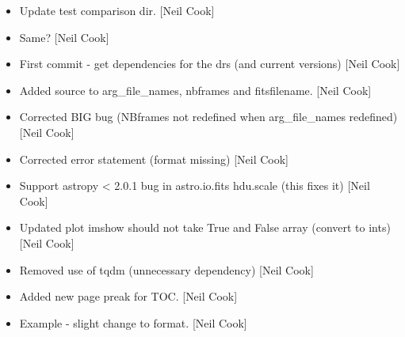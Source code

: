 \documentclass[a4paper,10pt,english]{report}
\begin{document}
\begin{itemize}
\item {} 
Update test comparison dir. {[}Neil Cook{]}

\item {} 
Same? {[}Neil Cook{]}

\item {} 
First commit - get dependencies for the drs (and current versions)
{[}Neil Cook{]}

\item {} 
Added source to arg\_file\_names, nbframes and fitsfilename. {[}Neil Cook{]}

\item {} 
Corrected BIG bug (NBframes not redefined when arg\_file\_names
redefined) {[}Neil Cook{]}

\item {} 
Corrected error statement (format missing) {[}Neil Cook{]}

\item {} 
Support astropy \textless{} 2.0.1 bug in astro.io.fits hdu.scale (this fixes it)
{[}Neil Cook{]}

\item {} 
Updated plot imshow should not take True and False array (convert to
ints) {[}Neil Cook{]}

\item {} 
Removed use of tqdm (unnecessary dependency) {[}Neil Cook{]}

\item {} 
Added new page preak for TOC. {[}Neil Cook{]}

\item {} 
Example - slight change to format. {[}Neil Cook{]}

\end{itemize}
\end{document}
